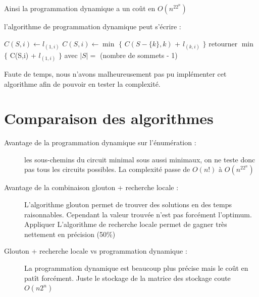 \documentclass[11pt]{article} \usepackage[top=2cm, bottom=2cm, left=2cm, right=2cm]{geometry}
\begin{document}
Ainsi la programmation dynamique a un coût en $O(n^22^n)$

l'algorithme de programmation dynamique peut s'écrire :
\begin{algorithmic}[]
\State $C(S,i) \gets l_{(1,i)}$
\EndFor
\Else
{}
\State $C(S,i) \gets \min$ $\{$ $C(S - \{ k \} ,k)$ + $l_{(k,i)}$ $\}$
\EndFor
\EndFor
\EndIf
\EndFor
\State retourner $\min$ $\{$ C(S,i) + $l_{(1,i)}$ $\}$ avec $|S| = $
(nombre de sommets - 1)
\end{algorithmic}
Faute de temps, nous n'avons malheureusement pas pu implémenter cet algorithme afin de pouvoir en tester la complexité.
\section{Comparaison des algorithmes}
\begin{description}
    \item[Avantage de la programmation dynamique sur l'énumération :] les sous-chemins du circuit minimal sous aussi
  minimaux, on ne teste donc pas tous les circuits possibles. La complexité passe de $O(n!)$ à $O(n^22^n)$
  \item[Avantage de la combinaison glouton + recherche locale :] L'algorithme glouton permet de trouver des solutions en
des temps raisonnables. Cependant la valeur trouvée n'est pas forcément l'optimum. Appliquer L'algorithme de recherche
locale permet de gagner très nettement en précision (50\%)
\item[Glouton + recherche locale vs programmation dynamique :] La programmation dynamique est beaucoup plus précise mais
le coût en patît forcément. Juste le stockage de la matrice des stockage coute $O(n2^n)$

\end{description}
\end{document}
